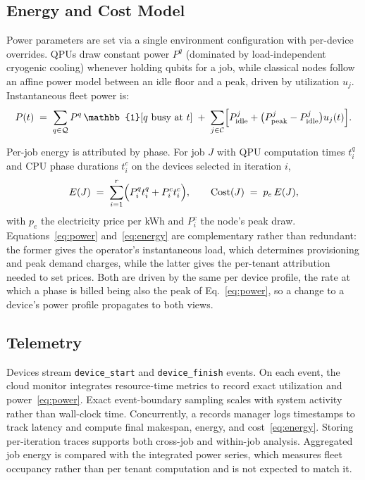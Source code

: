\subsection{Energy and Cost Model}
\label{sec:arch-energy}

Power parameters are set via a single environment configuration with per-device overrides. QPUs draw constant power $P^q$ (dominated by load-independent cryogenic cooling) whenever holding qubits for a job, while classical nodes follow an affine power model between an idle floor and a peak, driven by utilization $u_j$. Instantaneous fleet power is:
\begingroup
\small
\begin{equation}
\label{eq:power}
P(t) \;=\; \sum_{q \in \mathcal{Q}} P^{q}\,\mathbb{1}\!\left[\text{$q$ busy at $t$}\right]
\;+\; \sum_{j \in \mathcal{C}} \Bigl[P^{j}_{\mathrm{idle}} + \bigl(P^{j}_{\mathrm{peak}} - P^{j}_{\mathrm{idle}}\bigr) u_j(t)\Bigr].
\end{equation}
\endgroup

Per-job energy is attributed by phase. For job $J$ with QPU computation times $t^{q}_{i}$ and CPU phase durations $t^{c}_{i}$ on the devices selected in iteration $i$,
\begin{equation}
\label{eq:energy}
E(J) \;=\; \sum_{i=1}^{r}\Bigl(P^{q}_{i} t^{q}_{i} + P^{c}_{i} t^{c}_{i}\Bigr),
\qquad
\mathrm{Cost}(J) \;=\; p_e\, E(J),
\end{equation}
with $p_e$ the electricity price per kWh and $P^{c}_{i}$ the node's peak draw. Equations~\eqref{eq:power} and~\eqref{eq:energy} are complementary rather than redundant: the former gives the operator's instantaneous load, which determines provisioning and peak demand charges, while the latter gives the per-tenant attribution needed to set prices. Both are driven by the same per device profile, the rate at which a phase is billed being also the peak of Eq.~\eqref{eq:power}, so a change to a device's power profile propagates to both views.

\subsection{Telemetry}
\label{sec:arch-telemetry}

Devices stream \texttt{device\_start} and \texttt{device\_finish} events. On each event, the cloud monitor integrates resource-time metrics to record exact utilization and power~\eqref{eq:power}. Exact event-boundary sampling scales with system activity rather than wall-clock time. Concurrently, a records manager logs timestamps to track latency and compute final makespan, energy, and cost~\eqref{eq:energy}. Storing per-iteration traces supports both cross-job and within-job analysis. Aggregated job energy is compared with the integrated power series, which measures fleet occupancy rather than per tenant computation and is not expected to match it.


